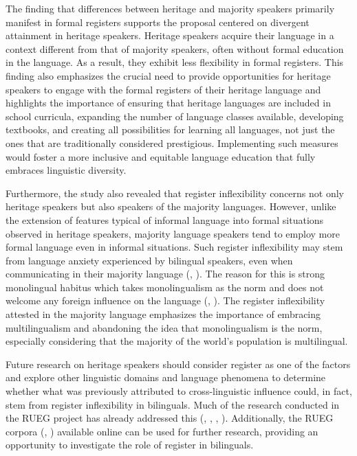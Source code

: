 The finding that differences between heritage and majority speakers primarily manifest in formal registers supports the proposal centered on divergent attainment in heritage speakers. Heritage speakers acquire their language in a context different from that of majority speakers, often without formal education in the language. As a result, they exhibit less flexibility in formal registers. This finding also emphasizes the crucial need to provide opportunities for heritage speakers to engage with the formal registers of their heritage language and highlights the importance of ensuring that heritage languages are included in school curricula, expanding the number of language classes available, developing textbooks, and creating all possibilities for learning all languages, not just the ones that are traditionally considered prestigious. Implementing such measures would foster a more inclusive and equitable language education that fully embraces linguistic diversity.

Furthermore, the study also revealed that register inflexibility concerns not only heritage speakers but also speakers of the majority languages. However, unlike the extension of features typical of informal language into formal situations observed in heritage speakers, majority language speakers tend to employ more formal language even in informal situations. Such register inflexibility may stem from language anxiety experienced by bilingual speakers, even when communicating in their majority language (\citealt{SevincDewaele2018}, \citealt{Bunk2024}). The reason for this is strong monolingual habitus which takes monolingualism as the norm and does not welcome any foreign influence on the language (\citealt{Wiese2020}, \citealt{KerswillWiese2022}). The register inflexibility attested in the majority language emphasizes the importance of embracing multilingualism and abandoning the idea that monolingualism is the norm, especially considering that the majority of the world’s population is multilingual.

Future research on heritage speakers should consider register as one of the factors and explore other linguistic domains and language phenomena to determine whether what was previously attributed to cross-linguistic influence could, in fact, stem from register inflexibility in bilinguals. Much of the research conducted in the RUEG project has already addressed this (\citealt{AlexiadouRizou2023}, \citealt{WieseEtAl2022}, \citealt{Tsehaye2023}, \citealt{SchroederEtAl2024}). Additionally, the RUEG corpora (\citealt{LudelingEtAl2022}, \citealt{IefremenkoEtAl2024}) available online can be used for further research, providing an opportunity to investigate the role of register in bilinguals.

